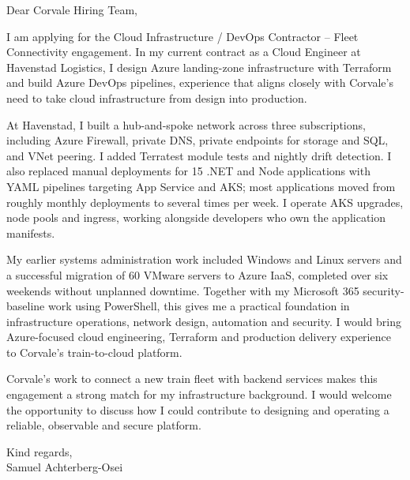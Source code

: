 \documentclass[11pt,a4paper]{article}
\begin{document}
\noindent Dear Corvale Hiring Team,

\vspace{0.8em}

I am applying for the Cloud Infrastructure / DevOps Contractor -- Fleet Connectivity engagement. In my current contract as a Cloud Engineer at Havenstad Logistics, I design Azure landing-zone infrastructure with Terraform and build Azure DevOps pipelines, experience that aligns closely with Corvale’s need to take cloud infrastructure from design into production.

\vspace{0.7em}

At Havenstad, I built a hub-and-spoke network across three subscriptions, including Azure Firewall, private DNS, private endpoints for storage and SQL, and VNet peering. I added Terratest module tests and nightly drift detection. I also replaced manual deployments for 15 .NET and Node applications with YAML pipelines targeting App Service and AKS; most applications moved from roughly monthly deployments to several times per week. I operate AKS upgrades, node pools and ingress, working alongside developers who own the application manifests.

\vspace{0.7em}

My earlier systems administration work included Windows and Linux servers and a successful migration of 60 VMware servers to Azure IaaS, completed over six weekends without unplanned downtime. Together with my Microsoft 365 security-baseline work using PowerShell, this gives me a practical foundation in infrastructure operations, network design, automation and security. I would bring Azure-focused cloud engineering, Terraform and production delivery experience to Corvale’s train-to-cloud platform.

\vspace{0.7em}

Corvale’s work to connect a new train fleet with backend services makes this engagement a strong match for my infrastructure background. I would welcome the opportunity to discuss how I could contribute to designing and operating a reliable, observable and secure platform.

\vspace{0.9em}

Kind regards,\\
Samuel Achterberg-Osei
\end{document}

